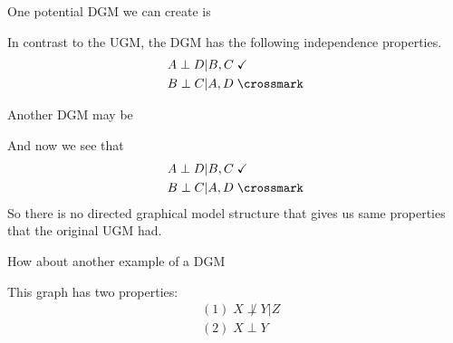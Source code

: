 \documentclass{article}
\begin{document}
One potential DGM we can create is
\begin{center}
\end{center}

In contrast to the UGM, the DGM has the following independence properties.
\begin{align}
&A \perp D|B,C \; \checkmark\\
&B \perp C|A,D \; \crossmark
\end{align}

Another DGM may be
\begin{center}
\end{center}
And now we see that
\begin{align}
&A \perp D|B,C \; \checkmark\\
&B \perp C|A,D \; \crossmark
\end{align}
So there is no directed graphical model structure that gives us same properties that the original UGM had.
\smallskip

How about another example of a DGM
\begin{center}
\end{center}
This graph has two properties:
\begin{align}
&(1) \; X \not\perp Y|Z \\
&(2) \; X \perp Y
\end{align}
\end{document}
